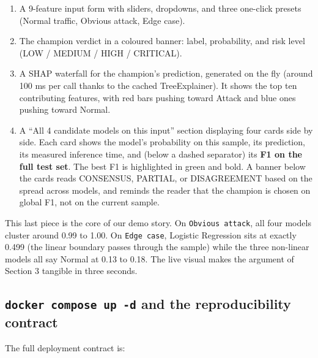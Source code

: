 \begin{enumerate}
\def\labelenumi{\arabic{enumi}.}
\tightlist
\item
  A 9-feature input form with sliders, dropdowns, and three one-click
  presets (Normal traffic, Obvious attack, Edge case).
\item
  The champion verdict in a coloured banner: label, probability, and
  risk level (LOW / MEDIUM / HIGH / CRITICAL).
\item
  A SHAP waterfall for the champion's prediction, generated on the fly
  (around 100 ms per call thanks to the cached TreeExplainer). It shows
  the top ten contributing features, with red bars pushing toward Attack
  and blue ones pushing toward Normal.
\item
  A ``All 4 candidate models on this input'' section displaying four
  cards side by side. Each card shows the model's probability on this
  sample, its prediction, its measured inference time, and (below a
  dashed separator) its \textbf{F1 on the full test set}. The best F1 is
  highlighted in green and bold. A banner below the cards reads
  CONSENSUS, PARTIAL, or DISAGREEMENT based on the spread across models,
  and reminds the reader that the champion is chosen on global F1, not
  on the current sample.
\end{enumerate}

This last piece is the core of our demo story. On
\texttt{Obvious\ attack}, all four models cluster around 0.99 to 1.00.
On \texttt{Edge\ case}, Logistic Regression sits at exactly 0.499 (the
linear boundary passes through the sample) while the three non-linear
models all say Normal at 0.13 to 0.18. The live visual makes the
argument of Section 3 tangible in three seconds.

\subsection{\texorpdfstring{\texttt{docker\ compose\ up\ -d} and the
reproducibility
contract}{docker compose up -d and the reproducibility contract}}\label{docker-compose-up--d-and-the-reproducibility-contract}

The full deployment contract is:

\begin{Shaded}
\begin{Highlighting}[]
\end{Highlighting}
\end{Shaded}

